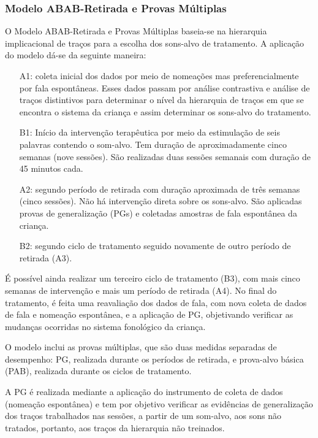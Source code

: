 \documentclass[output=paper,colorlinks,citecolor=brown,booklanguage=portuguese]{langscibook}
\begin{document}
\subsubsection{Modelo ABAB-Retirada e Provas Múltiplas}\label{sec:cap5sec2tresum}

O Modelo ABAB-Retirada e Provas Múltiplas \citep{Tyler1994} baseia-se na hierarquia implicacional de traços para a escolha dos sons-alvo de tratamento. A aplicação do modelo dá-se da seguinte maneira:

\begin{itemize}
\item [A1:] coleta inicial dos dados por meio de nomeações mas preferencialmente por fala espontâneas. Esses dados passam por análise contrastiva e análise de traços distintivos para determinar o nível da hierarquia de traços em que se encontra o sistema da criança e assim determinar os sons-alvo do tratamento.
\item [B1:] Início da intervenção terapêutica por meio da estimulação de seis palavras contendo o som-alvo. Tem duração de aproximadamente cinco semanas (nove sessões). São realizadas duas sessões semanais com duração de 45 minutos cada.
\item[A2:] segundo período de retirada com duração aproximada de três semanas (cinco sessões). Não há intervenção direta sobre os sons-alvo. São aplicadas provas de generalização (PGs) e coletadas amostras de fala espontânea da criança.
\item[B2:] segundo ciclo de tratamento seguido novamente de outro período de retirada (A3). 
\end{itemize}

É possível ainda realizar um terceiro ciclo de tratamento (B3), com mais cinco semanas de intervenção e mais um período de retirada (A4). No final do tratamento, é feita uma reavaliação dos dados de fala, com nova coleta de dados de fala e nomeação espontânea, e a aplicação de PG, objetivando verificar as mudanças ocorridas no sistema fonológico da criança.

O modelo inclui as provas múltiplas, que são duas medidas separadas de desempenho: PG, realizada durante os períodos de retirada, e prova-alvo básica (PAB), realizada durante os ciclos de tratamento.

A PG é realizada mediante a aplicação do instrumento de coleta de dados (nomeação espontânea) e tem por objetivo verificar as evidências de generalização dos traços trabalhados nas sessões, a partir de um som-alvo, aos sons não tratados, portanto, aos traços da hierarquia não treinados.
\end{document}
